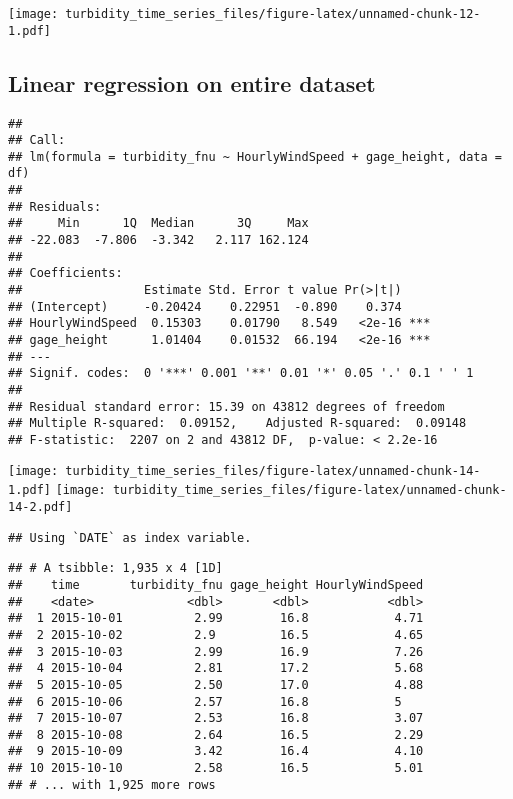 \documentclass[
]{article}
\begin{document}
\texttt{[image: turbidity\_time\_series\_files/figure-latex/unnamed-chunk-12-1.pdf]}

\hypertarget{linear-regression-on-entire-dataset}{%
\subsection{Linear regression on entire
dataset}\label{linear-regression-on-entire-dataset}}

\begin{verbatim}
## 
## Call:
## lm(formula = turbidity_fnu ~ HourlyWindSpeed + gage_height, data = df)
## 
## Residuals:
##     Min      1Q  Median      3Q     Max 
## -22.083  -7.806  -3.342   2.117 162.124 
## 
## Coefficients:
##                 Estimate Std. Error t value Pr(>|t|)    
## (Intercept)     -0.20424    0.22951  -0.890    0.374    
## HourlyWindSpeed  0.15303    0.01790   8.549   <2e-16 ***
## gage_height      1.01404    0.01532  66.194   <2e-16 ***
## ---
## Signif. codes:  0 '***' 0.001 '**' 0.01 '*' 0.05 '.' 0.1 ' ' 1
## 
## Residual standard error: 15.39 on 43812 degrees of freedom
## Multiple R-squared:  0.09152,    Adjusted R-squared:  0.09148 
## F-statistic:  2207 on 2 and 43812 DF,  p-value: < 2.2e-16
\end{verbatim}

\texttt{[image: turbidity\_time\_series\_files/figure-latex/unnamed-chunk-14-1.pdf]}
\texttt{[image: turbidity\_time\_series\_files/figure-latex/unnamed-chunk-14-2.pdf]}

\begin{verbatim}
## Using `DATE` as index variable.
\end{verbatim}

\begin{verbatim}
## # A tsibble: 1,935 x 4 [1D]
##    time       turbidity_fnu gage_height HourlyWindSpeed
##    <date>             <dbl>       <dbl>           <dbl>
##  1 2015-10-01          2.99        16.8            4.71
##  2 2015-10-02          2.9         16.5            4.65
##  3 2015-10-03          2.99        16.9            7.26
##  4 2015-10-04          2.81        17.2            5.68
##  5 2015-10-05          2.50        17.0            4.88
##  6 2015-10-06          2.57        16.8            5   
##  7 2015-10-07          2.53        16.8            3.07
##  8 2015-10-08          2.64        16.5            2.29
##  9 2015-10-09          3.42        16.4            4.10
## 10 2015-10-10          2.58        16.5            5.01
## # ... with 1,925 more rows
\end{verbatim}
\end{document}
